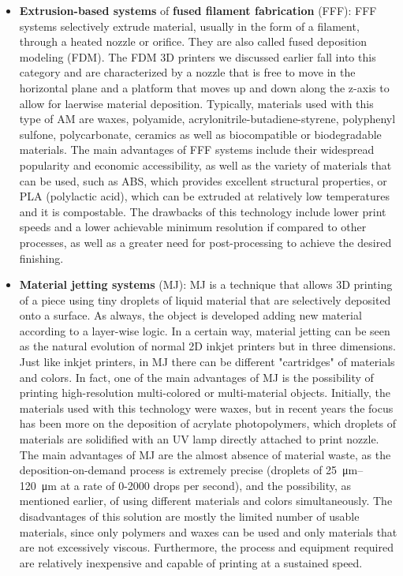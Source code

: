 \begin{itemize}
    \item \textbf{Extrusion-based systems} of \textbf{fused filament fabrication} (FFF): FFF systems selectively extrude material, usually in the form of a filament, through a heated nozzle or orifice. They are also called fused deposition modeling (FDM). The FDM 3D printers we discussed earlier fall into this category and are characterized by a nozzle that is free to move in the horizontal plane and a platform that moves up and down along the z-axis to allow for laerwise material deposition. Typically, materials used with this type of AM are waxes, polyamide, acrylonitrile-butadiene-styrene, polyphenyl sulfone, polycarbonate, ceramics as well as biocompatible or biodegradable materials. The main advantages of FFF systems include their widespread popularity and economic accessibility, as well as the variety of materials that can be used, such as ABS, which provides excellent structural properties, or PLA (polylactic acid), which can be extruded at relatively low temperatures and it is compostable. The drawbacks of this technology include lower print speeds and a lower achievable minimum resolution if compared to other processes, as well as a greater need for post-processing to achieve the desired finishing.
    \item \textbf{Material jetting systems} (MJ): MJ is a technique that allows 3D printing of a piece using tiny droplets of liquid material that are selectively deposited onto a surface. As always, the object is developed adding new material according to a layer-wise logic. In a certain way, material jetting can be seen as the natural evolution of normal 2D inkjet printers but in three dimensions. Just like inkjet printers, in MJ there can be different "cartridges" of materials and colors. In fact, one of the main advantages of MJ is the possibility of printing high-resolution multi-colored or multi-material objects. Initially, the materials used with this technology were waxes, but in recent years the focus has been more on the deposition of acrylate photopolymers, which droplets of materials are solidified with an UV lamp directly attached to print nozzle. The main advantages of MJ are the almost absence of material waste, as the deposition-on-demand process is extremely precise (droplets of \SIrange{25}{120}{\micro\meter} at a rate of 0-2000 drops per second), and the possibility, as mentioned earlier, of using different materials and colors simultaneously. The disadvantages of this solution are mostly the limited number of usable materials, since only polymers and waxes can be used and only materials that are not excessively viscous. Furthermore, the process and equipment required are relatively inexpensive and capable of printing at a sustained speed.

\end{itemize}
